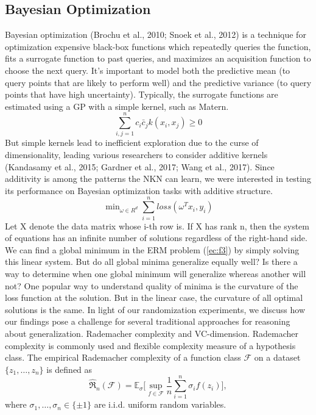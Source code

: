 \documentclass[9pt,a4paper,twoside]{tau}
\begin{document}
    \subsection{Bayesian Optimization}
       Bayesian optimization (Brochu et al., 2010; Snoek et al., 2012) is a technique for optimization expensive black-box functions which repeatedly queries the function, fits a surrogate function to past queries, and maximizes an acquisition function to choose the next query. It’s important to model both the predictive mean (to query points that are likely to perform well) and the predictive variance (to query points that have high uncertainty). Typically, the surrogate functions are estimated using a GP with a simple kernel, such as Matern.
       \begin{equation} \label{ec:f2}
			\sum_{i,j=1}^n c_i \bar c_j k(x_i,x_j) \ge 0
       \end{equation}
       But simple kernels lead to inefficient exploration due to the curse of dimensionality, leading various researchers to consider additive kernels (Kandasamy et al., 2015; Gardner et al., 2017; Wang et al., 2017). Since additivity is among the patterns the NKN can learn, we were interested in testing its performance on Bayesian optimization tasks with additive structure.
        \begin{equation} \label{ec:f3}
			\min\nolimits_{\omega\in{R^d}}\sum _{i=1}^n loss(\omega^T x_i,y_i) 
		\end{equation}
   Let X denote the data matrix whose i-th row is. If X has rank n, then the system of equations has an infinite number of solutions regardless of the right-hand side. We can find a global minimum in the ERM problem (\ref{ec:f3}) by simply solving this linear system. But do all global minima generalize equally well? Is there a way to determine when one global minimum will generalize whereas another will not? One popular way to understand quality of minima is the curvature of the loss function at the solution. But in the linear case, the curvature of all optimal solutions is the same.
In light of our randomization experiments, we discuss how our findings pose a challenge for several traditional approaches for reasoning about generalization. Rademacher complexity and VC-dimension. Rademacher complexity is commonly used and flexible complexity measure of a hypothesis class. The empirical Rademacher complexity of a function class $\mathcal{F}$ on a dataset ${\{z_1,…,z_n\}}$ is defined as
\begin{equation} \label{ec:f4}
			\hat\Re_n (\mathcal{F})=\mathds{E}_\sigma \Biggl[\sup_{f\in\mathcal{F}}\frac{1}{n}\sum_{i=1}^n \sigma_i f(z_i)\Biggr],
\end{equation}
 where $\sigma_1, \dots, \sigma_n \in \{\pm1\}$ are i.i.d. uniform random variables.
\end{document}
